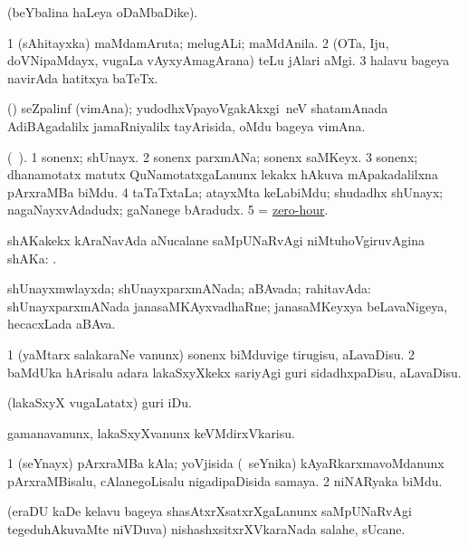 \bentry
{}
\gl{\saMkiSx} 
\bmng
{} (beYbalina haLeya oDaMbaDike).
\emng
\eentry

\bentry
{} 
\gl{\nA} 
\bmng
\bnum
\num{1} (sAhitayxka) maMdamAruta; melugALi; maMdAnila. 
\num{2} (OTa, Iju, doVNipaMdayx, \mo vugaLa vAyxyAmagArana) teLu jAlari aMgi. 
\num{3} halavu bageya navirAda hatitxya baTeTx.
\enum
\emng
\eentry

\bentry
{} 
\gl{\nA} (\ca) 
\bmng
seZpalinf (vimAna); yudodhxVpayoVgakAkxgi \,neV shatamAnada AdiBAgadalilx jamaRniyalilx  tayArisida, oMdu bageya vimAna.
\emng
\eentry

\bentry
{} 
\gl{\nA} 
\bmng
(\bava\ ). 
\bnum
\num{1} sonenx; shUnayx. 
\num{2} sonenx parxmANa; sonenx saMKeyx. 
\num{3} sonenx; dhanamotatx matutx QuNamotatxgaLanunx lekakx hAkuva mApakadalilxna pArxraMBa biMdu. 
\num{4} taTaTxtaLa; atayxMta keLabiMdu; shudadhx shUnayx; nagaNayxvAdadudx; gaNanege bAradudx. 
\num{5} = \hyperlink{zero-hour}{zero-hour}.
\enum
\emng

\noindent                                              
\gl{\pagu}  
\bmng
{} shAKakekx kAraNavAda aNucalane saMpUNaRvAgi niMtuhoVgiruvAgina  shAKa: .
\emng
\eentry

\bentry
{} 
\gl{\gu} 
\bmng
shUnayxmwlayxda; shUnayxparxmANada;  aBAvada;  rahitavAda:  shUnayxparxmANada janasaMKAyxvadhaRne; janasaMKeyxya beLavaNigeya, hecacxLada aBAva.
\emng
\eentry

\bentry
{} 
\gl{\sakirx} 
\bmng
\bnum
\num{1} (yaMtarx salakaraNe \mo vanunx) sonenx biMduvige tirugisu, aLavaDisu. 
\num{2} baMdUka hArisalu adara lakaSxyXkekx sariyAgi guri sidadhxpaDisu, aLavaDisu.
\enum
\emng

\noindent
\gl{\pagu} 
\bmng
\banum
{} (lakaSxyX \mo vugaLatatx) guri iDu. 

 gamanavanunx,  lakaSxyXvanunx  keVMdirxVkarisu.
\eanum
\emng
\eentry

\bentry
{} 
\gl{\nA} 
\bmng
\bnum
\num{1} (seYnayx) pArxraMBa kAla; yoVjisida (\kanmu\ seYnika) kAyaRkarxmavoMdanunx pArxraMBisalu, cAlanegoLisalu nigadipaDisida samaya. 
\num{2} niNARyaka biMdu.
\enum
\emng
\eentry

\bentry
{}  
\gl{\nA} 
\bmng
(eraDU kaDe kelavu bageya shasAtxrXsatxrXgaLanunx saMpUNaRvAgi tegeduhAkuvaMte niVDuva) nishashxsitxrXVkaraNada salahe, sUcane.
\emng
\eentry

